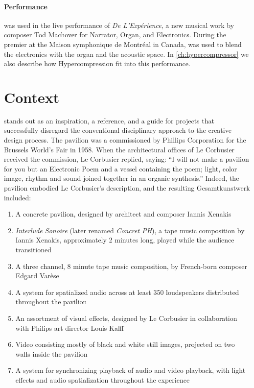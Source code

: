 \paragraph{Performance}
\thesis was used in the live performance of \textit{De
  L'Exp\'{e}rience}, a new musical work by composer Tod Machover for
Narrator, Organ, and Electronics. During the premier at the Maison
symphonique de Montr\'{e}al in Canada, \thesis was used to blend the
electronics with the organ and the acoustic space. In
\autoref{ch:hypercompressor} we also describe how Hypercompression fit
into this performance. 

\section{Context}
\label{sec:context}

 stands out as an inspiration, a
reference, and a guide for projects that successfully disregard the
conventional disciplinary approach to the creative design process. The
pavilion was a commissioned by Phillips Corporation for the Brussels
World's Fair in 1958.\cite{Zvonar1999} When the architectural offices of
Le Corbusier received the commission, Le Corbusier replied, saying:
``I will not make a pavilion for you but an Electronic Poem and a
vessel containing the poem; light, color image, rhythm and sound
joined together in an organic synthesis.''\cite{Lopez2011} Indeed,
the pavilion embodied Le Corbusier's description, and the resulting
Gesamtkunstwerk included:\cite{Lombardo2009}
\begin{enumerate}
\item A concrete pavilion, designed by architect and composer Iannis
  Xenakis
\item \textit{Interlude Sonoire} (later renamed \textit{Concret PH}), a
  tape music composition by Iannis Xenakis, approximately 2 minutes
  long, played while the audience transitioned
\item A three channel, 8 minute tape music composition, by French-born
  composer Edgard Var\`{e}se
\item A system for spatialized audio across at least 350 loudspeakers
  distributed throughout the pavilion
\item An assortment of visual effects, designed by Le Corbusier in
  collaboration with Philips art director Louis Kalff
\item Video consisting mostly of black and white still images,
  projected on two walls inside the pavilion
\item A system for synchronizing playback of audio and video playback,
  with light effects and audio spatialization throughout the
  experience
\end{enumerate} 


